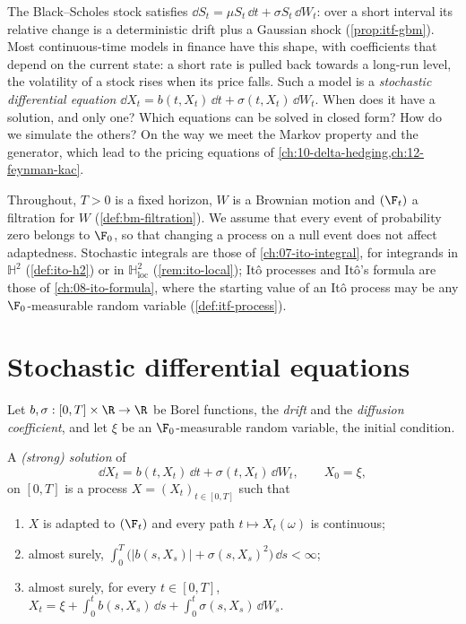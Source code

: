 
The Black--Scholes stock satisfies $\dd S_t=\mu S_t\,\dd t+\sigma S_t\,\dd W_t$: over a short
interval its relative change is a deterministic drift plus a Gaussian shock
(\cref{prop:itf-gbm}). Most continuous-time models in finance have this shape, with
coefficients that depend on the current state: a short rate is pulled back towards a
long-run level, the volatility of a stock rises when its price falls. Such a model is a
\emph{stochastic differential equation}
$\dd X_t=b(t,X_t)\,\dd t+\sigma(t,X_t)\,\dd W_t$. When does it have a solution, and only one?
Which equations can be solved in closed form? How do we simulate the others? On the way we
meet the Markov property and the generator, which lead to the pricing equations of
\cref{ch:10-delta-hedging,ch:12-feynman-kac}.

Throughout, $T>0$ is a fixed horizon, $W$ is a Brownian motion and $(\F_t)$ a filtration for
$W$ (\cref{def:bm-filtration}). We assume that every event of probability zero belongs to
$\F_0$, so that changing a process on a null event does not affect adaptedness. Stochastic
integrals are those of \cref{ch:07-ito-integral}, for integrands in $\mathbb H^2$
(\cref{def:ito-h2}) or in $\mathbb H^2_{\mathrm{loc}}$ (\cref{rem:ito-local}); It\^o
processes and It\^o's formula are those of \cref{ch:08-ito-formula}, where the starting value
of an It\^o process may be any $\F_0$-measurable random variable (\cref{def:itf-process}).

\section{Stochastic differential equations}\label{sec:sde-def}

Let $b,\sigma:[0,T]\times\R\to\R$ be Borel functions, the \emph{drift} and the
\emph{diffusion coefficient}, and let $\xi$ be an $\F_0$-measurable random variable, the
initial condition.

\begin{definition}\label{def:sde-solution}
A \emph{(strong) solution} of
\begin{equation}\label{eq:sde}
  \dd X_t=b(t,X_t)\,\dd t+\sigma(t,X_t)\,\dd W_t,\qquad X_0=\xi,
\end{equation}
on $[0,T]$ is a process $X=(X_t)_{t\in[0,T]}$ such that
\begin{enumerate}[label=(\roman*)]
  \item $X$ is adapted to $(\F_t)$ and every path $t\mapsto X_t(\omega)$ is continuous;
  \item almost surely, $\int_0^T\big(|b(s,X_s)|+\sigma(s,X_s)^2\big)\,\dd s<\infty$;
  \item almost surely, for every $t\in[0,T]$,
    $X_t=\xi+\int_0^tb(s,X_s)\,\dd s+\int_0^t\sigma(s,X_s)\,\dd W_s$.
\end{enumerate}
\end{definition}

